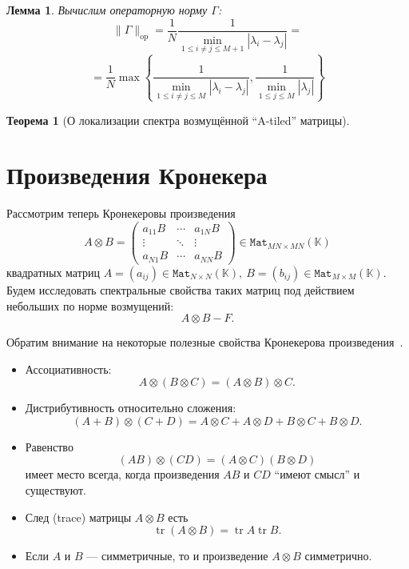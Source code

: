 \documentclass[14pt,a4paper]{extarticle}
\numberwithin{equation}{section}
\newtheorem{thm}{Теорема}
\newtheorem{lem}{Лемма}
\theoremstyle{definition}
\begin{document}
\begin{lem}
    Вычислим операторную норму \( \Gamma \):
    \[
        \|\Gamma\|_{\mathrm{op}} =
        \frac1N
        \frac{1}{\min\limits_{1\leq i{\neq}j \leq M{+}1}|\lambda_i - \lambda_j|} =
        \]
    \[
        = \frac1N
         \max\left\{
         \frac{1}{
             \min\limits_{1\leq i{\neq}j \leq M }{|\lambda_i - \lambda_j|}},
         \frac{1}{
             \min\limits_{1\leq j \leq M}{|\lambda_j|}}
         \right\}
        \]
\end{lem}

\begin{thm}[О локализации спектра возмущённой ``A-tiled'' матрицы]\label{nk:thm:tiled}
  
\end{thm}

\newpage
\section{Произведения Кронекера}

Рассмотрим теперь Кронекеровы произведения
\[
    A\otimes B =
    \begin{pmatrix}
        a_{11} B & \cdots & a_{1N} B \\
        \vdots   & \ddots & \vdots \\
        a_{N1} B & \cdots & a_{NN} B
    \end{pmatrix}
    \in \mathtt{Mat}_{{MN}{\times}{MN}}(\mathbb{K})
\]
квадратных матриц
\( A={(a_{ij})}\in\mathtt{Mat}_{N{\times}N}(\mathbb{K}),
 \ B={(b_{ij})}\in\mathtt{Mat}_{M{\times}M}(\mathbb{K}). \)
Будем исследовать спектральные свойства таких матриц под действием небольших по
норме возмущений:
\begin{equation}\label{-kronperturb}
    A\otimes B - F.
\end{equation}


Обратим внимание на некоторые полезные свойства Кронекерова произведения~\cite{bellman-matrices-kron}.
\begin{itemize}
\item Ассоциативность:
    \[ A\otimes (B\otimes C) = (A\otimes B)\otimes C. \]
\item Дистрибутивность относительно сложения:
    \[ (A+B)\otimes(C+D) = A\otimes C + A\otimes D + B\otimes C + B\otimes D. \]
\item Равенство
    \[ (AB)\otimes(CD) = (A\otimes C)(B\otimes D) \]
    имеет место
    всегда, когда произведения \( AB \) и \( CD \) ``имеют смысл'' и существуют.
  \item След (trace) матрицы \( A\otimes B \) есть
    \[ \operatorname{tr}(A\otimes B) = \operatorname{tr}A\operatorname{tr}B. \]
\item Если \( A \) и \( B \) --- симметричные,
      то и произведение \( A\otimes B \) симметрично.
\end{itemize}
\end{document}
